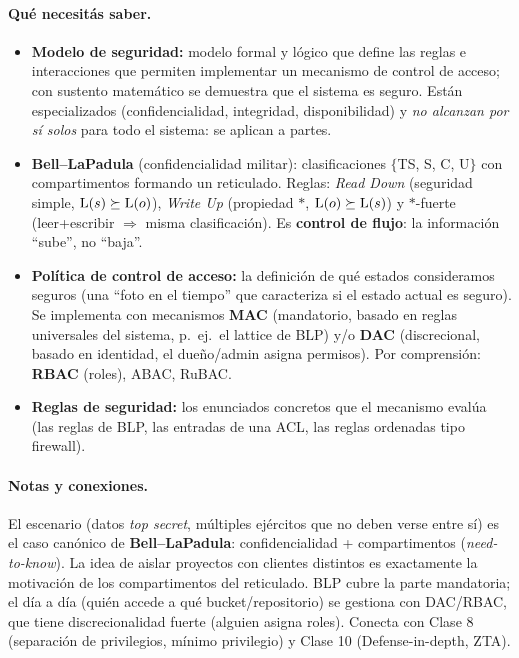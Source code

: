\paragraph{Qué necesitás saber.}
\begin{itemize}
  \item \textbf{Modelo de seguridad:} modelo formal y lógico que define las reglas e
  interacciones que permiten implementar un mecanismo de control de acceso; con sustento
  matemático se demuestra que el sistema es seguro. Están especializados (confidencialidad,
  integridad, disponibilidad) y \emph{no alcanzan por sí solos} para todo el sistema: se
  aplican a partes.
  \item \textbf{Bell--LaPadula} (confidencialidad militar): clasificaciones $\{$TS, S, C, U$\}$
  con compartimentos formando un reticulado. Reglas: \emph{Read Down} (seguridad simple,
  $\mathrm{L}(s)\succeq\mathrm{L}(o)$), \emph{Write Up} (propiedad $\ast$, $\mathrm{L}(o)\succeq\mathrm{L}(s)$) y
  $\ast$-fuerte (leer+escribir $\Rightarrow$ misma clasificación). Es \textbf{control de
  flujo}: la información ``sube'', no ``baja''.
  \item \textbf{Política de control de acceso:} la definición de qué estados consideramos
  seguros (una ``foto en el tiempo'' que caracteriza si el estado actual es seguro). Se
  implementa con mecanismos \textbf{MAC} (mandatorio, basado en reglas universales del
  sistema, p.\ ej.\ el lattice de BLP) y/o \textbf{DAC} (discrecional, basado en identidad,
  el dueño/admin asigna permisos). Por comprensión: \textbf{RBAC} (roles), ABAC, RuBAC.
  \item \textbf{Reglas de seguridad:} los enunciados concretos que el mecanismo evalúa
  (las reglas de BLP, las entradas de una ACL, las reglas ordenadas tipo firewall).
\end{itemize}

\paragraph{Notas y conexiones.}
El escenario (datos \emph{top secret}, múltiples ejércitos que no deben verse entre sí)
es el caso canónico de \textbf{Bell--LaPadula}: confidencialidad + compartimentos
(\emph{need-to-know}). La idea de aislar proyectos con clientes distintos
es exactamente la motivación de los compartimentos del reticulado. BLP cubre la parte
mandatoria; el día a día (quién accede a qué bucket/repositorio) se gestiona con DAC/RBAC,
que tiene discrecionalidad fuerte (alguien asigna roles). Conecta con Clase 8 (separación
de privilegios, mínimo privilegio) y Clase 10 (Defense-in-depth, ZTA).

